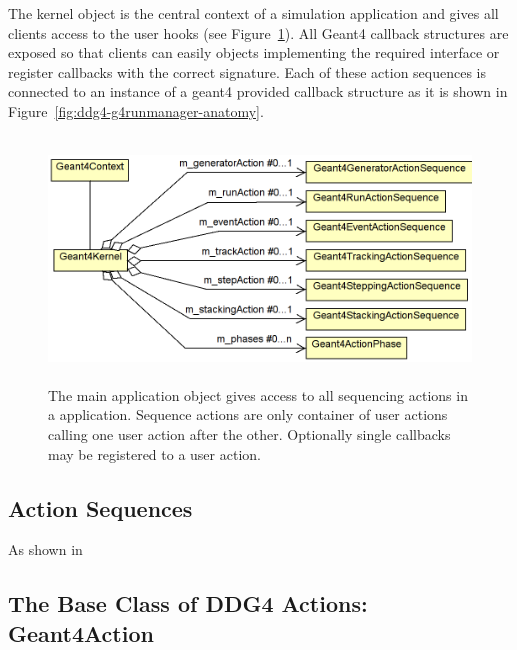 \documentclass[10pt,a4paper]{article}
\begin{document}
\noindent
The kernel object is the central context of a \DDG simulation application and
gives all clients access to the user hooks (see Figure~\ref{fig:ddg4-geant4-kernel}).
All Geant4 callback structures are exposed so that clients can easily 
objects implementing the required interface or register callbacks with the 
correct signature. Each of these action sequences is connected to an instance
of a geant4 provided callback structure as it is shown in 
Figure~\ref{fig:ddg4-g4runmanager-anatomy}.
\begin{figure}[h]
  \begin{center}
    \includegraphics[height=65mm] {DDG4-Geant4Kernel.png}
    \caption{The main application object gives access to all sequencing actions
    in a  application. Sequence actions are only container of user actions
    calling one user action after the other. Optionally single callbacks may 
    be registered to a user action.}
    \label{fig:ddg4-geant4-kernel}
  \end{center}
\end{figure}

\subsection{Action Sequences}
\label{sec:ddg4-user-manual-implementation-geant4action-sequences}

\noindent
As shown in 

\subsection{The Base Class of DDG4 Actions: Geant4Action}
\label{sec:ddg4-user-manual-implementation-geant4action-base}
\end{document}
